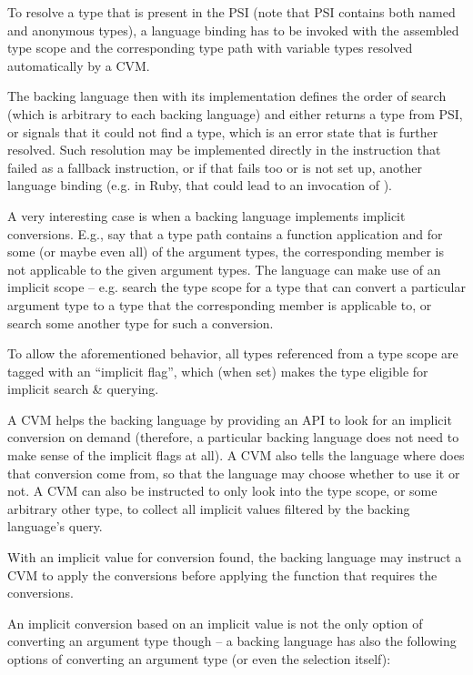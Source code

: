 To resolve a type that is present in the PSI (note that PSI contains both named and anonymous types), a language binding has to be invoked with the assembled type scope and the corresponding type path with variable types resolved automatically by a CVM. 

The backing language then with its implementation defines the order of search (which is arbitrary to each backing language) and either returns a type from PSI, or signals that it could not find a type, which is an error state that is further resolved. Such resolution may be implemented directly in the instruction that failed as a fallback instruction, or if that fails too or is not set up, another language binding (e.g. in Ruby, that could lead to an invocation of ). 

A very interesting case is when a backing language implements implicit conversions. E.g., say that a type path contains a function application and for some (or maybe even all) of the argument types, the corresponding member is not applicable to the given argument types. The language can make use of an implicit scope -- e.g. search the type scope for a type that can convert a particular argument type to a type that the corresponding member is applicable to, or search some another type for such a conversion. 

To allow the aforementioned behavior, all types referenced from a type scope are tagged with an ``implicit flag'', which (when set) makes the type eligible for implicit search \& querying. 

A CVM helps the backing language by providing an API to look for an implicit conversion on demand (therefore, a particular backing language does not need to make sense of the implicit flags at all). A CVM also tells the language where does that conversion come from, so that the language may choose whether to use it or not. A CVM can also be instructed to only look into the type scope, or some arbitrary other type, to collect all implicit values filtered by the backing language's query. 

With an implicit value for conversion found, the backing language may instruct a CVM to apply the conversions before applying the function that requires the conversions. 

An implicit conversion based on an implicit value is not the only option of converting an argument type though -- a backing language has also the following options of converting an argument type (or even the selection itself): 

